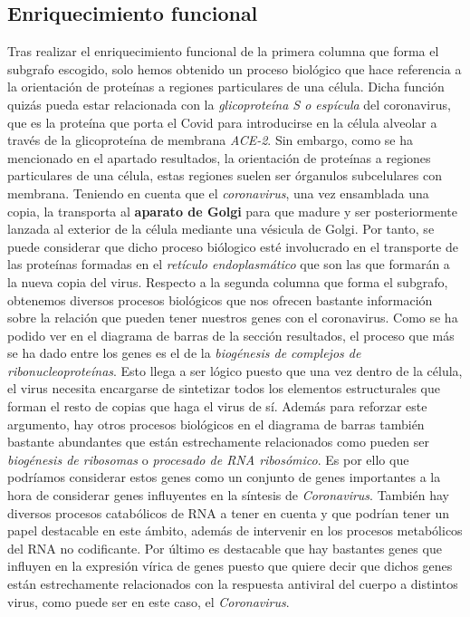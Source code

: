 \subsection{Enriquecimiento funcional}
Tras realizar el enriquecimiento funcional de la primera columna que forma el subgrafo escogido, solo hemos obtenido un proceso biol\'ogico que hace referencia a la orientaci\'on de prote\'inas a regiones particulares de una c\'elula. Dicha funci\'on quiz\'as pueda estar relacionada con la \textit{glicoprote\'ina S o esp\'icula} del coronavirus, que es la prote\'ina que porta el Covid para introducirse en la c\'elula alveolar a trav\'es de la glicoprote\'ina de membrana \textit{ACE-2}. Sin embargo, como se ha mencionado en el apartado resultados, la orientaci\'on de prote\'inas a regiones particulares de una c\'elula, estas regiones suelen ser \'organulos subcelulares con membrana. Teniendo en cuenta que el \textit{coronavirus}, una vez ensamblada una copia, la transporta al \textbf{aparato de Golgi} para que madure y ser posteriormente lanzada al exterior de la c\'elula mediante una v\'esicula de Golgi. Por tanto, se puede considerar que dicho proceso bi\'ologico est\'e involucrado en el transporte de las prote\'inas formadas en el \textit{ret\'iculo endoplasm\'atico} que son las que formar\'an a la nueva copia del virus.\newline
Respecto a la segunda columna que forma el subgrafo, obtenemos diversos procesos biol\'ogicos que nos ofrecen bastante informaci\'on sobre la relaci\'on que pueden tener nuestros genes con el coronavirus. Como se ha podido ver en el diagrama de barras de la secci\'on resultados, el proceso que m\'as se ha dado entre los genes es el de la \textit{biog\'enesis de complejos de ribonucleoprote\'inas}. Esto llega a ser l\'ogico puesto que una vez dentro de la c\'elula, el virus necesita encargarse de sintetizar todos los elementos estructurales que forman el resto de copias que haga el virus de s\'i. Adem\'as para reforzar este argumento, hay otros procesos biol\'ogicos en el diagrama de barras tambi\'en bastante abundantes que est\'an estrechamente relacionados como pueden ser \textit{biog\'enesis de ribosomas} o \textit{procesado de RNA ribos\'omico}. Es por ello que podr\'iamos considerar estos genes como un conjunto de genes importantes a la hora de considerar genes influyentes en la s\'intesis de \textit{Coronavirus}.
Tambi\'en hay diversos procesos catab\'olicos de RNA a tener en cuenta y que podr\'ian tener un papel destacable en este \'ambito, adem\'as de intervenir en los procesos metab\'olicos del RNA no codificante.
Por \'ultimo es destacable que hay bastantes genes que influyen en la expresi\'on v\'irica de genes puesto que quiere decir que dichos genes est\'an estrechamente relacionados con la respuesta antiviral del cuerpo a distintos virus, como puede ser en este caso, el \textit{Coronavirus}.

